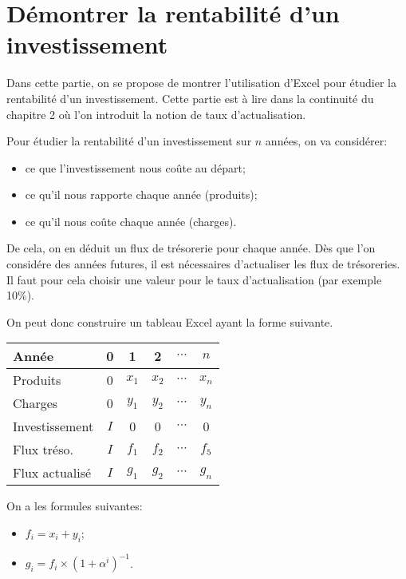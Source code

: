 
\chapter{Démontrer la rentabilité d'un investissement}


Dans cette partie, on se propose de montrer l'utilisation d'Excel 
pour étudier la rentabilité d'un investissement.
Cette partie est à lire dans la continuité du chapitre 2 où l'on introduit 
la notion de taux d'actualisation.

Pour étudier la rentabilité d'un investissement sur $n$ années, 
on va considérer:
\begin{itemize}
  \item ce que l'investissement nous coûte au départ;
  \item ce qu'il nous rapporte chaque année (produits);
  \item ce qu'il nous coûte chaque année (charges).
\end{itemize}

De cela, on en déduit un flux de trésorerie pour chaque année. 
Dès que l'on considére des années futures, il est nécessaires d'actualiser 
les flux de trésoreries. Il faut pour cela choisir une valeur pour le taux 
d'actualisation (par exemple 10\%).

On peut donc construire un tableau Excel ayant la forme suivante.

\begin{center}
\begingroup
\scriptsize
\begin{tabular}{lccccc}
  Année          & 0   & 1     & 2     & $\cdots$ & $n$ \\
  \hline
  Produits       & 0   & $x_1$ & $x_2$ & $\cdots$ & $x_n$ \\
  Charges        & 0   & $y_1$ & $y_2$ & $\cdots$ & $y_n$ \\
  Investissement & $I$ & 0     & 0     & $\cdots$ & 0 \\
  \hline
  Flux tréso.\/  & $I$ & $f_1$ & $f_2$ & $\cdots$ & $f_5$ \\
  Flux actualisé & $I$ & $g_1$ & $g_2$ & $\cdots$ & $g_n$ \\
\end{tabular}
\endgroup
\end{center}

On a les formules suivantes:
\begin{itemize}
  \item $f_i = x_i + y_i$;
  \item $g_i = f_i \times (1 + \alpha^i)^{-1}$.
\end{itemize}

